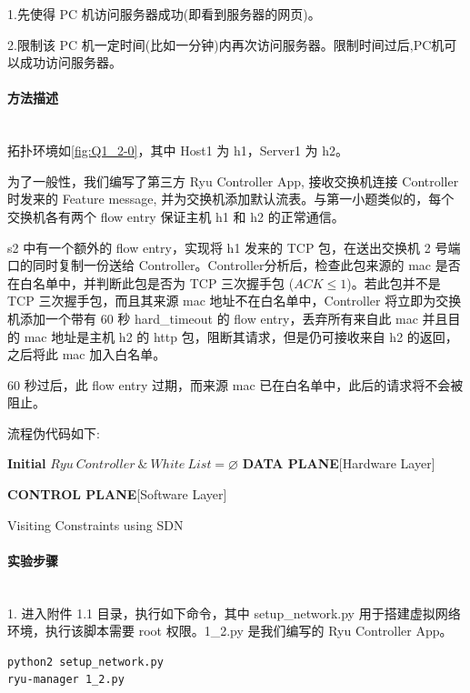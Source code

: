 \documentclass[format=draft,language=chinese,category=SDN]{hustreport}
\newcommand{\myparagraph}[1]{\paragraph{#1}\mbox{}\\}
\begin{document}
1.先使得 PC 机访问服务器成功(即看到服务器的网页)。

2.限制该 PC 机一定时间(比如一分钟)内再次访问服务器。限制时间过后,PC机可以成功访问服务器。

\myparagraph{方法描述}

拓扑环境如\autoref{fig:Q1_2-0}，其中 Host1 为 h1，Server1 为 h2。

为了一般性，我们编写了第三方 Ryu Controller App, 接收交换机连接 Controller 时发来的 Feature message, 并为交换机添加默认流表。与第一小题类似的，每个交换机各有两个 flow entry 保证主机 h1 和 h2 的正常通信。

s2 中有一个额外的 flow entry，实现将 h1 发来的 TCP 包，在送出交换机 2 号端口的同时复制一份送给 Controller。Controller分析后，检查此包来源的 mac 是否在白名单中，并判断此包是否为 TCP 三次握手包 ($ACK \leq 1$)。若此包并不是 TCP 三次握手包，而且其来源 mac 地址不在白名单中，Controller 将立即为交换机添加一个带有 60 秒 hard\_timeout 的 flow entry，丢弃所有来自此 mac 并且目的 mac 地址是主机 h2 的 http 包，阻断其请求，但是仍可接收来自 h2 的返回，之后将此 mac 加入白名单。

60 秒过后，此 flow entry 过期，而来源 mac 已在白名单中，此后的请求将不会被阻止。

流程伪代码如下:

\begin{algorithm}[H]
	\SetAlgoLined
	\textbf{Initial}  $Ryu~Controller~\&~White~List = \varnothing$ \;\label{alg_line:Q1_2DataPlane}
	\textbf{DATA PLANE}[Hardware Layer]\;

	\textbf{CONTROL PLANE}[Software Layer]\;
	\caption{Visiting Constraints using SDN}\label{alg:Q1_2}
\end{algorithm}

\myparagraph{实验步骤}

1. 进入附件 1.1 目录，执行如下命令，其中 setup\_network.py 用于搭建虚拟网络环境，执行该脚本需要 root 权限。1\_2.py 是我们编写的 Ryu Controller App。

\begin{lstlisting}
python2 setup_network.py
ryu-manager 1_2.py
\end{lstlisting}
\end{document}
